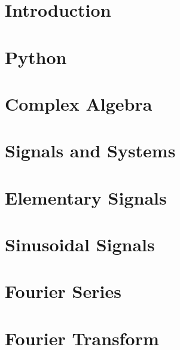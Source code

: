 \documentclass{tufte-book}
\begin{document}
\ifSpIntro
\chapter{Introduction}

\fi

\ifSpPython
\chapter{Python} 


 \ifSpExerciseSol
   
 \fi
\fi

\ifSpComplex
\chapter{Complex Algebra}


 \ifSpExerciseSol
 
 \fi
\fi

\ifSpSigSys
\chapter{Signals and Systems}


 \ifSpExerciseSol
 
 \fi
\fi

\ifSpElSig
\chapter{Elementary Signals}


 \ifSpExerciseSol
 
 \fi
\fi

\ifSpSin
\chapter{Sinusoidal Signals}


 \ifSpExerciseSol
 
 \fi
\fi

\ifSpdB

\fi

\ifSpFourierSer
\chapter{Fourier Series}


 \ifSpExerciseSol
 
 \fi



\fi

\ifSpProgA

\fi

\ifSpFourierTra
\chapter{Fourier Transform}


 \ifSpExerciseSol
 
 \fi


\fi
\end{document}
